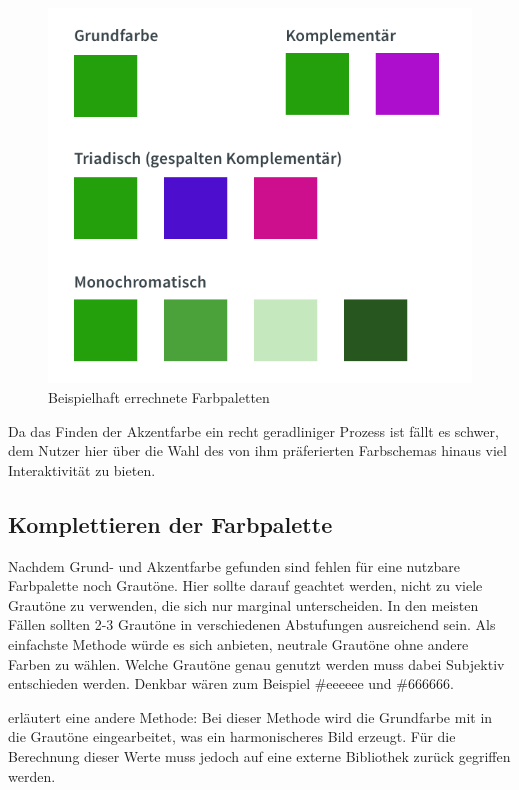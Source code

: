 \begin{figure}[h]
    \centering
    \includegraphics[width=1\textwidth]{images/color-schemes.png}
    \caption{Beispielhaft errechnete Farbpaletten}
    \label{fig:color-schemes}
\end{figure}

Da das Finden der Akzentfarbe ein recht geradliniger Prozess ist fällt es schwer, dem Nutzer hier über die Wahl des von ihm präferierten Farbschemas hinaus viel Interaktivität zu bieten.

\subsection{Komplettieren der Farbpalette}

Nachdem Grund- und Akzentfarbe gefunden sind fehlen für eine nutzbare Farbpalette noch Grautöne.  Hier sollte darauf geachtet werden, nicht zu viele Grautöne zu verwenden, die sich nur marginal unterscheiden. In den meisten Fällen sollten 2-3 Grautöne in verschiedenen Abstufungen ausreichend sein.
Als einfachste Methode würde es sich anbieten, neutrale Grautöne ohne andere Farben zu wählen. Welche Grautöne genau genutzt werden muss dabei Subjektiv entschieden werden. Denkbar wären zum Beispiel \#eeeeee und \#666666.

\cite{elizabeth2016simple} erläutert eine andere Methode: Bei dieser Methode wird die Grundfarbe mit in die Grautöne eingearbeitet, was ein harmonischeres Bild erzeugt.  Für die Berechnung dieser Werte muss jedoch auf eine externe Bibliothek zurück gegriffen werden.

